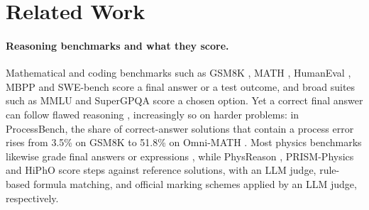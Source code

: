 
\section{Related Work}
\label{sec:related}

\paragraph{Reasoning benchmarks and what they score.}
Mathematical and coding benchmarks such as GSM8K \citep{cobbe2021gsm8k}, MATH \citep{hendrycks2021math}, HumanEval \citep{chen2021humaneval}, MBPP \citep{austin2021mbpp} and SWE-bench \citep{jimenez2024swebench} score a final answer or a test outcome, and broad suites such as MMLU \citep{hendrycks2021mmlu} and SuperGPQA \citep{du2025supergpqa} score a chosen option.
Yet a correct final answer can follow flawed reasoning \citep{cobbe2021gsm8k}, increasingly so on harder problems: in ProcessBench, the share of correct-answer solutions that contain a process error rises from 3.5\% on GSM8K to 51.8\% on Omni-MATH \citep{zheng2024processbench}.
Most physics benchmarks likewise grade final answers or expressions \citep{xu2025ugphysics,qiu2025phybench,zhang2025abenchphysics,wang2023scibench}, while PhysReason \citep{zhang2025physreason}, PRISM-Physics \citep{zhao2026prismphysics} and HiPhO \citep{yu2026hipho} score steps against reference solutions, with an LLM judge, rule-based formula matching, and official marking schemes applied by an LLM judge, respectively.

